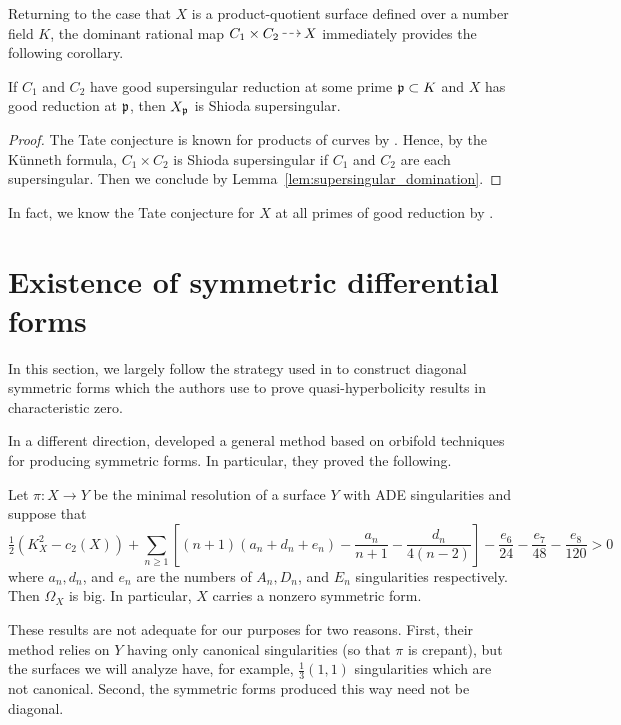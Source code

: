 \documentclass[main.tex]{subfiles}
\begin{document}
Returning to the case that $X$ is a product-quotient surface defined over a number field $K$, the dominant rational map $C_1 \times C_2 \rat X$ immediately provides the following corollary.

\begin{cor} \label{cor:curves_supersingular}
If $C_1$ and $C_2$ have good supersingular reduction at some prime $\mathfrak{p} \subset K$ and $X$ has good reduction at $\mathfrak{p}$, then $X_{\mathfrak{p}}$ is Shioda supersingular.
\end{cor}

\begin{proof}
The Tate conjecture is known for products of curves by \cite[Theorem 4]{tate:endomorphisms}. Hence, by the K\"{u}nneth formula, $C_1 \times C_2$ is Shioda supersingular if $C_1$ and $C_2$ are each supersingular. Then we conclude by Lemma~\ref{lem:supersingular_domination}. 
\end{proof}

In fact, we know the Tate conjecture for $X$ at all primes of good reduction by \cite[Theorem 5.2(b)]{tate:algebraic_cycles}. 

\section{Existence of symmetric differential forms}

In this section, we largely follow the strategy used in \cite{church:lang_product_quotient} to construct diagonal symmetric forms which the authors use to prove quasi-hyperbolicity results in characteristic zero. 
\par 
In a different direction, \cite{roulleau:canonical_sheaves} developed a general method based on orbifold techniques for producing symmetric forms. In particular, they proved the following.

\begin{theorem} \cite[Theorem 1]{roulleau:canonical_sheaves}
Let $\pi : X \to Y$ be the minimal resolution of a surface $Y$ with ADE singularities and suppose that
\[ \tfrac{1}{2} (K_X^2 - c_2(X)) + \sum_{n \ge 1} \left[ (n+1) (a_n + d_n + e_n) - \frac{a_n}{n+1} - \frac{d_n}{4(n-2)} \right] - \frac{e_6}{24} - \frac{e_7}{48} - \frac{e_8}{120} > 0 \]
where $a_n, d_n$, and $e_n$ are the numbers of $A_n, D_n$, and $E_n$ singularities respectively. Then $\Omega_X$ is big. In particular, $X$ carries a nonzero symmetric form.
\end{theorem}

These results are not adequate for our purposes for two reasons. First, their method relies on $Y$ having only canonical singularities (so that $\pi$ is crepant), but the surfaces we will analyze have, for example, $\tfrac{1}{3}(1,1)$ singularities which are not canonical. Second, the symmetric forms produced this way need not be diagonal. 
\end{document}
